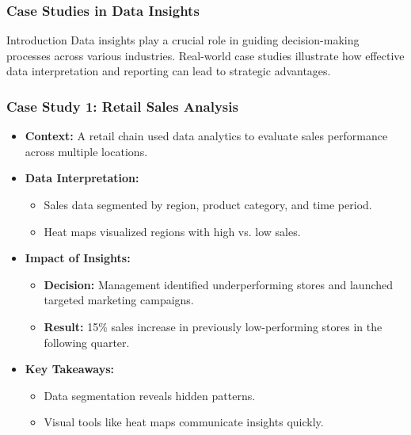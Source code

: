 \documentclass[aspectratio=169]{beamer}
\begin{document}
\begin{frame}[fragile]
    \frametitle{Case Studies in Data Insights}
    \begin{block}{Introduction}
        Data insights play a crucial role in guiding decision-making processes across various industries. Real-world case studies illustrate how effective data interpretation and reporting can lead to strategic advantages.
    \end{block}
\end{frame}

\begin{frame}[fragile]
    \frametitle{Case Study 1: Retail Sales Analysis}
    \begin{itemize}
        \item \textbf{Context:} A retail chain used data analytics to evaluate sales performance across multiple locations.
        \item \textbf{Data Interpretation:}
            \begin{itemize}
                \item Sales data segmented by region, product category, and time period.
                \item Heat maps visualized regions with high vs. low sales.
            \end{itemize}
        \item \textbf{Impact of Insights:}
            \begin{itemize}
                \item \textbf{Decision:} Management identified underperforming stores and launched targeted marketing campaigns.
                \item \textbf{Result:} 15\% sales increase in previously low-performing stores in the following quarter.
            \end{itemize}
        \item \textbf{Key Takeaways:}
            \begin{itemize}
                \item Data segmentation reveals hidden patterns.
                \item Visual tools like heat maps communicate insights quickly.
            \end{itemize}
    \end{itemize}
\end{frame}
\end{document}
